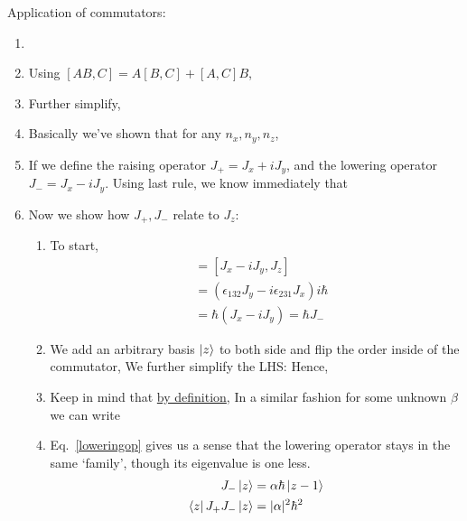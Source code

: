 \documentclass{school-22.101-notes}
\begin{document}
Application of commutators:
\begin{enumerate}
\item 
{}
\item Using $[AB,C] = A[B,C] + [A,C] B$, 
\item Further simplify, 
\item Basically we've shown that for any $n_x, n_y, n_z$, 
\item If we define the raising operator $J_+ = J_x + iJ_y$, and the lowering operator $J_- = J_x - iJ_y$. Using last rule, we know immediately that 
\item Now we show how $J_+, J_-$ relate to $J_z$: 
  \begin{enumerate}
  \item To start, 
    \begin{align}
      [J_-, J_z] &= [J_x - i J_y, J_z]  \\
      &= \left( \epsilon_{132} J_y - i \epsilon_{231} J_x \right) i \hbar \\
      &= \hbar (J_x - i J_y)  = \hbar J_- 
    \end{align}
  \item We add an arbitrary basis $\left| z \right>$ to both side and flip the order inside of the commutator, 
    We further simplify the LHS: 
    Hence, 
  \item Keep in mind that \uline{by definition}, 
    In a similar fashion for some unknown $\beta$ we can write 
  \item Eq.~\ref{loweringop} gives us a sense that the lowering operator stays in the same `family', though its eigenvalue is one less. 
    \begin{align}
      J_- \ket{z} &= \alpha \hbar \ket{z-1} \\
      \bra{z} J_+ J_- \ket{z} &= |\alpha|^2 \hbar^2 \\

\end{align}
\end{enumerate}
\end{enumerate}
\end{document}
